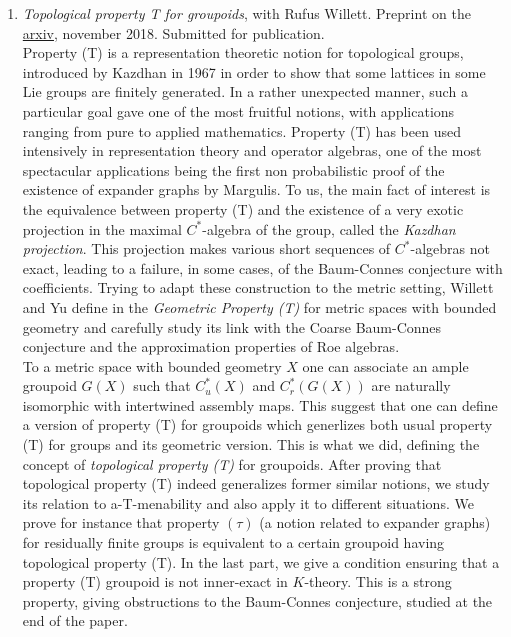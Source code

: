 \documentclass[a4paper]{article}
\begin{document}
\begin{enumerate}
\item \textit{Topological property T for groupoids}, with Rufus Willett. Preprint on the \href{https://arxiv.org/abs/1811.07085}{arxiv}, november 2018. Submitted for publication.\\

Property (T) is a representation theoretic notion for topological groups, introduced by Kazdhan \cite{kazhdan} in 1967 in order to show that some lattices in some Lie groups are finitely generated. In a rather unexpected manner, such a particular goal gave one of the most fruitful notions, with applications ranging from pure to applied mathematics. Property (T) has been used intensively in representation theory and operator algebras, one of the most spectacular applications being the first non probabilistic proof of the existence of expander graphs by Margulis. To us, the main fact of interest is the equivalence between property (T) and the existence of a  very exotic projection in the maximal $C^*$-algebra of the group, called the \textit{Kazdhan projection}. This projection makes various short sequences of $C^*$-algebras not exact, leading to a failure, in some cases, of the Baum-Connes conjecture with coefficients. Trying to adapt these construction to the metric setting, Willett and Yu define in \cite{WillettYu} the \textit{Geometric Property (T)} for metric spaces with bounded geometry and carefully study its link with the Coarse Baum-Connes conjecture and the approximation properties of Roe algebras.\\

To a metric space with bounded geometry $X$ one can associate an ample groupoid $G(X)$ such that  $C^*_u(X)$ and $C_r^*(G(X))$ are naturally isomorphic with intertwined assembly maps. This suggest that one can define a version of property (T) for groupoids which generlizes both usual property (T) for groups and its geometric version. This is what we did, defining the concept of \textit{topological property (T)} for groupoids. After proving that topological property (T) indeed generalizes former similar notions, we study its relation to a-T-menability and also apply it to different situations. We prove for instance that property $(\tau)$ (a notion related to expander graphs) for residually finite groups is equivalent to a certain groupoid having topological property (T). In the last part, we give a condition ensuring that a property (T) groupoid is not inner-exact in $K$-theory. This is a strong property, giving obstructions to the Baum-Connes conjecture, studied at the end of the paper.\\


\end{enumerate}
\end{document}
